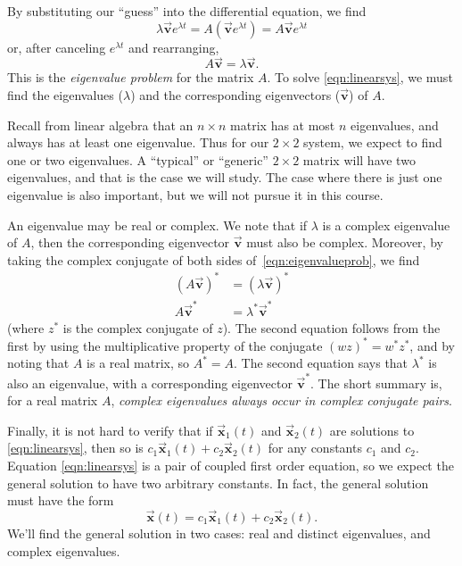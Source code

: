 \documentclass[reqno]{immbook}
\newcommand{\BV}{\vec{\textbf{v}}}
\newcommand{\BX}{\vec{\textbf{x}}}
\numberwithin{equation}{chapter}
\numberwithin{question}{section}
\numberwithin{theorem}{chapter}
\numberwithin{figure}{chapter}
\theoremstyle{definition}
\begin{document}
By substituting our ``guess'' into the differential equation, we
find
\begin{equation}
  \lambda \BV e^{\lambda t} = A\left(\BV e^{\lambda t}\right)
       = A\BV e^{\lambda t}
\end{equation}
or, after canceling $e^{\lambda t}$ and rearranging,
\begin{equation}
   A\BV = \lambda \BV.
\label{eqn:eigenvalueprob}
\end{equation}
This is the \emph{eigenvalue problem}
for the matrix $A$.
To solve \eqref{eqn:linearsys}, we must find
the eigenvalues ($\lambda$) and
the corresponding eigenvectors ($\BV$) of $A$.

Recall from linear algebra that an $n\times n$ matrix
has at most $n$ eigenvalues, and always has at least
one eigenvalue.  Thus for our $2\times 2$
system, we expect to find one or two eigenvalues.
A ``typical'' or ``generic'' $2\times 2$ matrix
will have two eigenvalues, and that is the case
we will study.  The case where there is just one
eigenvalue is also important, but we will not pursue
it in this course.

An eigenvalue may be real or complex. We note that
if $\lambda$ is a complex eigenvalue of $A$, then
the corresponding eigenvector $\BV$ must also be
complex. Moreover, by taking the complex conjugate
of both sides of~\eqref{eqn:eigenvalueprob},
we find
\begin{equation}
\begin{split}
   (A\BV)^* & = (\lambda \BV)^* \\
   A\BV^* & = \lambda^* \BV^*
\end{split}
\end{equation}
(where $z^*$ is the complex conjugate of $z$).
The second equation follows from the first
by using the multiplicative property of the conjugate
$(wz)^* = w^* z^*$, and
by noting that
$A$ is a real matrix, so $A^*=A$.
The second equation says that $\lambda^*$ is also an eigenvalue,
with a corresponding eigenvector $\BV^*$.
The short summary is, for a real matrix $A$,
\emph{complex eigenvalues always occur in complex conjugate
pairs}.

Finally, it is not hard to verify that if $\BX_1(t)$ and
$\BX_2(t)$ are solutions to \eqref{eqn:linearsys}, then
so is $c_1 \BX_1(t) + c_2\BX_2(t)$ for any constants
$c_1$ and $c_2$.  Equation \eqref{eqn:linearsys} is
a pair of coupled first order equation, so we expect the
general solution to have two arbitrary constants.
In fact, the general solution must have the form
\begin{equation}
  \BX(t) = c_1 \BX_1(t) + c_2 \BX_2(t).
\end{equation}
We'll find the general solution in two cases: real and distinct eigenvalues,
and complex eigenvalues.
\end{document}
